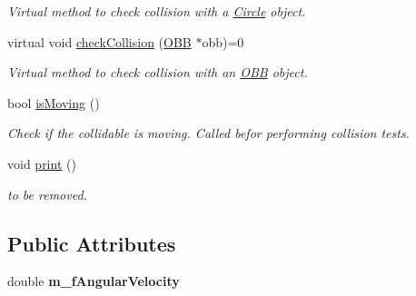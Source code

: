 \begin{DoxyCompactItemize}
\begin{DoxyCompactList}\small\item\em Virtual method to check collision with a \hyperlink{class_circle}{Circle} object. \end{DoxyCompactList}\item 
\hypertarget{class_collidable_a90789947098d0f6f43e3ef8a944a5657}{}virtual void \hyperlink{class_collidable_a90789947098d0f6f43e3ef8a944a5657}{check\+Collision} (\hyperlink{class_o_b_b}{O\+B\+B} $\ast$obb)=0\label{class_collidable_a90789947098d0f6f43e3ef8a944a5657}

\begin{DoxyCompactList}\small\item\em Virtual method to check collision with an \hyperlink{class_o_b_b}{O\+B\+B} object. \end{DoxyCompactList}\item 
\hypertarget{class_collidable_a8d46b697385b10bc9447f1ac18a587a6}{}bool \hyperlink{class_collidable_a8d46b697385b10bc9447f1ac18a587a6}{is\+Moving} ()\label{class_collidable_a8d46b697385b10bc9447f1ac18a587a6}

\begin{DoxyCompactList}\small\item\em Check if the collidable is moving. Called befor performing collision tests. \end{DoxyCompactList}\item 
\hypertarget{class_collidable_ac4597915c92e32ea10220808da31c750}{}void \hyperlink{class_collidable_ac4597915c92e32ea10220808da31c750}{print} ()\label{class_collidable_ac4597915c92e32ea10220808da31c750}

\begin{DoxyCompactList}\small\item\em to be removed. \end{DoxyCompactList}\end{DoxyCompactItemize}
\subsection*{Public Attributes}
\begin{DoxyCompactItemize}
\item 
\hypertarget{class_collidable_a5a6501f0c062b6c24f3121c5c68b59d4}{}double {\bfseries m\+\_\+f\+Angular\+Velocity}\label{class_collidable_a5a6501f0c062b6c24f3121c5c68b59d4}

\end{DoxyCompactItemize}
